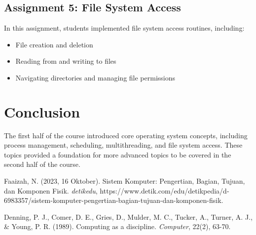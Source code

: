 \documentclass[12pt]{article}
\begin{document}
\subsection{Assignment 5: File System Access}
In this assignment, students implemented file system access routines, including:
\begin{itemize}
    \item File creation and deletion
    \item Reading from and writing to files
    \item Navigating directories and managing file permissions
\end{itemize}

\section{Conclusion}
The first half of the course introduced core operating system concepts, including process management, scheduling, multithreading, and file system access. These topics provided a foundation for more advanced topics to be covered in the second half of the course.

\begin{thebibliography}{99}

 Faaizah, N. (2023, 16 Oktober). Sistem Komputer: Pengertian, Bagian, Tujuan, dan Komponen Fisik. \textit{detikedu}, https://www.detik.com/edu/detikpedia/d-6983357/sistem-komputer-pengertian-bagian-tujuan-dan-komponen-fisik.

 Denning, P. J., Comer, D. E., Gries, D., Mulder, M. C., Tucker, A., Turner, A. J., \& Young, P. R. (1989). Computing as a discipline. \textit{Computer}, 22(2), 63-70.

\end{thebibliography}
\end{document}
